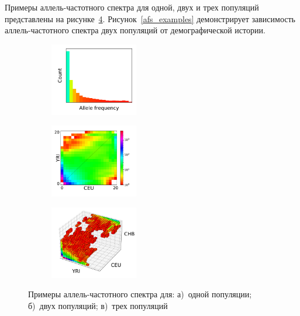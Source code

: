 Примеры аллель-частотного спектра для одной, двух и трех популяций представлены на рисунке~\ref{afs_examples_d}.
Рисунок~\ref{afs_examples} демонстрирует зависимость аллель-частотного спектра двух популяций от демографической истории.

\begin{figure}[t]
    \begin{subfigure}[b]{.33\textwidth}
    \includegraphics[height=3.2cm]{images/part1/data/1d_plot.pdf}
    \caption{}
    \label{fig:example_afs_1d}
    \end{subfigure}%
    \begin{subfigure}[b]{.33\textwidth}
    \includegraphics[height=3.2cm]{images/part1/data/2d_plot.pdf}
    \caption{}
    \label{fig:example_afs_2d}
    \end{subfigure}%
    \begin{subfigure}[b]{.33\textwidth}
    \includegraphics[height=3.2cm]{images/part1/data/3d_plot.pdf}
    \caption{}
    \label{fig:example_afs_3d}
    \end{subfigure}
    \caption{Примеры аллель-частотного спектра для: а)~одной популяции; б)~двух популяций; в)~трех популяций}\label{afs_examples_d}
\end{figure}


